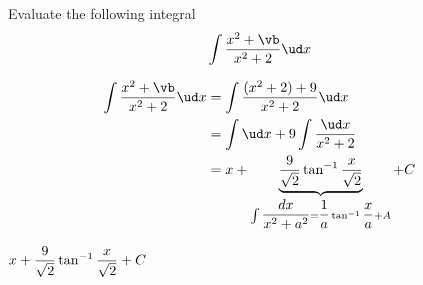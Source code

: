 

\ADD\va\vd\vb

\question[2] Evaluate the following integral 
\[ \int\dfrac{x^2+\vb}{x^2+\va}\ud x\]

\watchout

\begin{solution}[\halfpage]
	\begin{align}
		\int\dfrac{x^2+\vb}{x^2+\va}\ud x &= \int\dfrac{(x^2+\va)+\vd}{x^2+\va}\ud x \\
		&= \int\ud x + \vd\int\dfrac{\ud x}{x^2+\va} \\ 
    &= x + \underbrace{\dfrac\vd{\sqrt\va}\tan^{-1}\dfrac{x}{\sqrt\va}}_{\int\dfrac{dx}{x^2+a^2}=\dfrac{1}{a}\tan^{-1}\dfrac{x}{a}+A} + C
	\end{align}
\end{solution}

\ifprintanswers
  \begin{codex}
    $x+\dfrac{9}{\sqrt{2}}\tan^{-1}\dfrac{x}{\sqrt{2}}+C$
  \end{codex}
\fi
